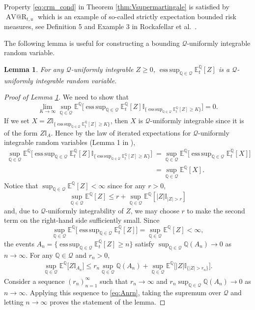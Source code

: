 \documentclass[11pt,a4paper]{article}
\makeatletter
\newtheorem{lemma}{Lemma}
\newcommand{\E}{\mathbb{E}}
\newcommand{\AVaR}{\operatorname{AV@R}}
\DeclareMathOperator*{\esssup}{ess\,sup}
\newcommand{\Q}{\mathbb{Q}}
\newcommand{\calQ}{\mathcal{Q}}
\newcommand{\indic}{\mathbb{I}}
\makeatother
\begin{document}
Property \eqref{eq:crm_cond} in Theorem \ref{thm:Vsupermartingale} is satisfied by $\AVaR_{t,u}$ which is an example of so-called strictly expectation bounded risk measures, see Definition 5 and Example 3 in Rockafellar et al.~\cite{Rockafellar-et-al-06}. 

The following lemma is useful for constructing a bounding $\calQ$-uniformly integrable random variable. 

\begin{lemma}\label{lem:unif_int}
For any $\calQ$-uniformly integrable $Z \geq 0$, $\esssup_{\Q\in\calQ}\E_t^{\Q}[Z]$ is a $\calQ$-uniformly integrable random variable.
\end{lemma}
\begin{proof}[Proof of Lemma \ref{lem:unif_int}]
We need to show that
$$
\lim_{K\to\infty}\sup_{\Q\in\calQ}\E^{\Q}\Big[\esssup_{\Q\in\calQ}\E_t^{\Q}[Z]\indic_{\{\esssup_{\Q\in\calQ}\E_t^{\Q}[Z] \geq K\}}\Big]=0.
$$ 
If we set $X= Z\indic_{\{\esssup_{\Q\in\calQ}\E_t^{\Q}[Z] \geq K\}}$, then $X$ is $\calQ$-uniformly integrable since it is of the form  $Z\indic_A$. Hence by the law of iterated expectations for $\calQ$-uniformly integrable random variables (Lemma 1 in \cite{Riedel-09}), 
\begin{align*}
\sup_{\Q\in\calQ}\E^{\Q}\Big[\esssup_{\Q\in\calQ}\E_t^{\Q}[Z]\indic_{\{\esssup_{\Q\in\calQ}\E_t^{\Q}[Z] \geq K\}}\Big] 
&= \sup_{\Q\in\calQ}\E^{\Q}\Big[\esssup_{\Q\in\calQ}\E_t^{\Q}[X]\Big] \\
&= \sup_{\Q\in\calQ}\E^{\Q}[X].
\end{align*}
Notice that $\sup_{\Q \in \calQ}\E^{\Q}[Z]<\infty$ since for any $r>0$, 
$$
\sup_{\Q \in \calQ}\E^{\Q}[Z]\leq r+\sup_{\Q \in \calQ}\E^{\Q}[|Z|\indic_{|Z|>r}]
$$
and, due to $\calQ$-uniformly integrability of $Z$, we may choose $r$ to make the second term on the right-hand side sufficiently small.   
Since
$$
\sup_{\Q\in\calQ}\E^{\Q}\Big[\esssup_{\Q\in\calQ}\E_t^{\Q}[Z]\Big] =  \sup_{\Q \in \calQ}\E^{\Q}[Z]<\infty,
$$
the events $A_n = \{\esssup_{\Q\in\calQ}\E_t^{\Q}[Z] \geq n\}$ satisfy $\sup_{\Q \in \calQ} \Q(A_n) \to 0$ as $n \to \infty$. For any $\Q\in\calQ$ and $r_n>0$, 
\begin{align}\label{eq:Anrn}
\sup_{\Q\in\calQ}\E^{\Q}\Big[Z\indic_{A_n}\Big]\leq r_n\sup_{\Q\in\calQ}\Q(A_n)+\sup_{\Q\in\calQ}\E^{\Q}\Big[|Z|\indic_{\{|Z|>r_n\}}\Big].
\end{align}
Consider a sequence $(r_n)_{n=1}^{\infty}$ such that $r_n\to\infty$ and $r_n\sup_{\Q \in \calQ} \Q(A_n) \to 0$ as $n \to \infty$.
Applying this sequence to \eqref{eq:Anrn}, taking the supremum over $\calQ$ and letting $n\to\infty$ proves the statement of the lemma.
\end{proof}
\end{document}
